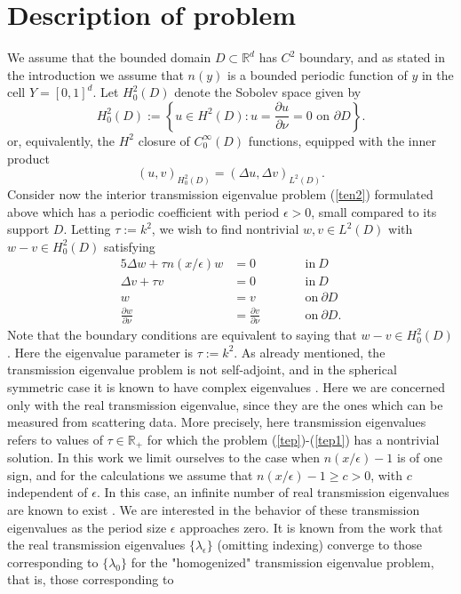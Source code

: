 \documentclass[12pt]{article}
\begin{document}
\section{Description of problem}
We assume that the  bounded domain $D \subset \mathbb{R}^d$ has  $C^2$ boundary, and  as stated in the introduction we assume that  $n(y)$ is a bounded  periodic function of $y$ in the cell $Y= [0,1]^d $.  Let $H^2_0(D)$ denote the Sobolev space given by
$$H^2_0(D) := \left \{  u\in H^2(D) : u=\frac{\partial u}{\partial \nu}=0\text{ on $\partial D$} \right \}.$$ 
or, equivalently, the $H^2$ closure of $C^\infty_0(D)$ functions, equipped with the inner product 
$$ (u,v)_{H^2_0(D)} = (\Delta u , \Delta v)_{L^2(D)}.$$
Consider now the interior transmission eigenvalue problem (\ref{ten2}) formulated above  which has a periodic coefficient with period $\epsilon>0$, small compared to its support $D$.  Letting $\tau:=k^2$, we wish to find nontrivial  $w, v\in L^2(D)$ with $w-v\in H^2_0(D)$ satisfying  
\begin{alignat}{5}\label{tep}
\Delta w+\tau n(x/\epsilon) w &= 0 &\qquad & \mathrm{in} \ D \\
\Delta v+\tau v& =0 & &  \mathrm{in}\  D \\
w&= v  & &\mathrm{on} \ \partial D \\
\displaystyle \frac{\partial w}{\partial \nu}&=\displaystyle \frac{\partial v}{\partial \nu} & & \mathrm{on}\  \partial D.\label{tep1} 
\end{alignat}
Note that the boundary conditions are equivalent to saying that $w-v \in H^2_0(D)$. Here the eigenvalue parameter is $\tau:=k^2$. As already mentioned, the transmission eigenvalue problem is not self-adjoint, and in the spherical symmetric case it is known to have complex eigenvalues \cite[Chapter 6]{CCH-book}. Here we are concerned only with the real transmission eigenvalue, since they are the ones which can be measured from scattering data.  More precisely, here transmission eigenvalues refers to values of $\tau\in{\mathbb R}_+$ for which the problem (\ref{tep})-(\ref{tep1}) has a nontrivial solution.
In this work we limit ourselves to the case when $n(x/\epsilon)-1$ is of one sign, and for the calculations we assume that $n(x/\epsilon) -1 \geq c >0 $, with $c$ independent of $\epsilon$. In this case, an infinite number of real transmission eigenvalues are known to exist \cite{CaGiHa}. We are interested in the behavior of these transmission eigenvalues as the period size $\epsilon$ approaches zero. It is known from the work \cite{CaHaHa} that the real transmission eigenvalues $\{ \lambda_\epsilon \} $ (omitting indexing) converge to those corresponding to $\{\lambda_0\}$  for the "homogenized" transmission eigenvalue problem, that is, those corresponding to 
\end{document}
